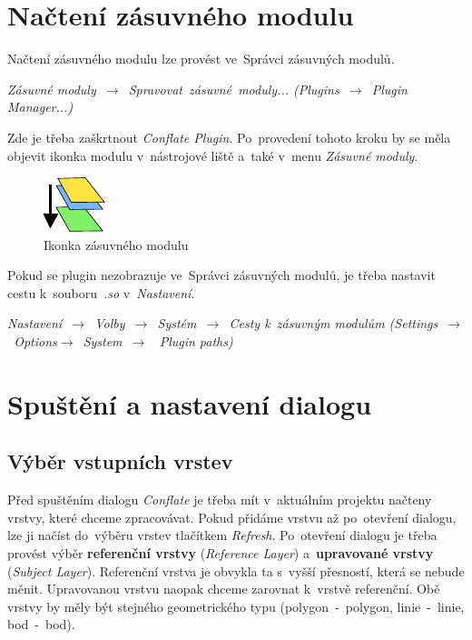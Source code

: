 \section{Načtení zásuvného modulu}
\label{prirucka-nacteni}

Načtení zásuvného modulu lze provést ve~Správci zásuvných modulů.
\begin{center}
\textit{Zásuvné moduly~$\rightarrow$~Spravovat~zásuvné~moduly... 
(Plugins~$\rightarrow$~Plugin Manager...)}
\end{center}
Zde je třeba zaškrtnout \textit{Conflate Plugin}. Po~provedení tohoto kroku by se 
měla objevit ikonka modulu v~nástrojové liště a~také v~menu \textit{Zásuvné moduly}. 

  \begin{figure}[H]
    \centering
      \includegraphics{./pictures/mActionConflate.pdf}
      \caption{Ikonka zásuvného modulu}
      \label{fig:ikonka}
  \end{figure}

Pokud se plugin nezobrazuje ve~Správci zásuvných modulů, je třeba nastavit cestu 
k~souboru~\textit{.so} v~\textit{Nastavení}.
\begin{center} 
\textit{Nastavení~$\rightarrow$~Volby~$\rightarrow$~Systém~$\rightarrow$~Cesty 
k~zásuvným modulům (Settings~$\rightarrow$~Options$\rightarrow$~System~$\rightarrow$
~Plugin paths)}
\end{center}


\section{Spuštění a nastavení dialogu}
\label{prirucka-spusteni}

\subsection{Výběr vstupních vrstev}
Před spuštěním dialogu \textit{Conflate} je třeba mít v~aktuálním projektu 
načteny vrstvy, které chceme zpracovávat. Pokud přidáme vrstvu až po~otevření
dialogu, lze ji načíst do~výběru vrstev tlačítkem \textit{Refresh}.
Po~otevření dialogu je třeba provést výběr \textbf{re\-ferenční vrstvy} 
(\textit{Reference Layer}) a~\textbf{upravované vrstvy} (\textit{Subject Layer}). 
Re\-ferenční vrstva je obvykla ta s~vyšší přesností, která se nebude měnit. 
Upravovanou vrstvu naopak chceme zarovnat k~vrstvě referenční. 
Obě vrstvy by měly být stejného geometrického typu (polygon~-~polygon, 
linie~-~linie, bod~-~bod).

